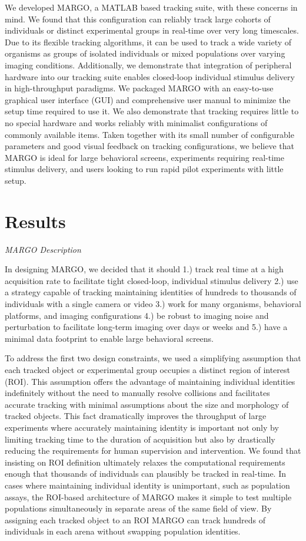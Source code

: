 \documentclass[10pt]{article}
\begin{document}
\begin{multicols}{2}
We developed MARGO, a MATLAB based tracking suite, with these concerns in mind. We found that this configuration can reliably track large cohorts of individuals or distinct experimental groups in real-time over very long timescales. Due to its flexible tracking algorithms, it can be used to track a wide variety of organisms as groups of isolated individuals or mixed populations over varying imaging conditions. Additionally, we demonstrate that integration of peripheral hardware into our tracking suite enables closed-loop individual stimulus delivery in high-throughput paradigms. We packaged MARGO with an easy-to-use graphical user interface (GUI) and comprehensive user manual to minimize the setup time required to use it. We also demonstrate that tracking requires little to no special hardware and works reliably with minimalist configurations of commonly available items. Taken together with its small number of configurable parameters and good visual feedback on tracking configurations, we believe that MARGO is ideal for large behavioral screens, experiments requiring real-time stimulus delivery, and users looking to run rapid pilot experiments with little setup.

\section*{Results}

\textit{MARGO Description}

In designing MARGO, we decided that it should 1.) track real time at a high acquisition rate to facilitate tight closed-loop, individual stimulus delivery 2.) use a strategy capable of tracking maintaining identities of hundreds to thousands of individuals with a single camera or video 3.) work for many organisms, behavioral platforms, and imaging configurations 4.) be robust to imaging noise and perturbation to facilitate long-term imaging over days or weeks and 5.) have a minimal data footprint to enable large behavioral screens.

To address the first two design constraints, we used a simplifying assumption that each tracked object or experimental group occupies a distinct region of interest (ROI). This assumption offers the advantage of maintaining individual identities indefinitely without the need to manually resolve collisions and facilitates accurate tracking with minimal assumptions about the size and morphology of tracked objects. This fact dramatically improves the throughput of large experiments where accurately maintaining identity is important not only by limiting tracking time to the duration of acquisition but also by drastically reducing the requirements for human supervision and intervention. We found that insisting on ROI definition ultimately relaxes the computational requirements enough that thousands of individuals can plausibly be tracked in real-time. In cases where maintaining individual identity is unimportant, such as population assays, the ROI-based architecture of MARGO makes it simple to test multiple populations simultaneously in separate areas of the same field of view. By assigning each tracked object to an ROI MARGO can track hundreds of individuals in each arena without swapping population identities.


\end{multicols}
\end{document}
